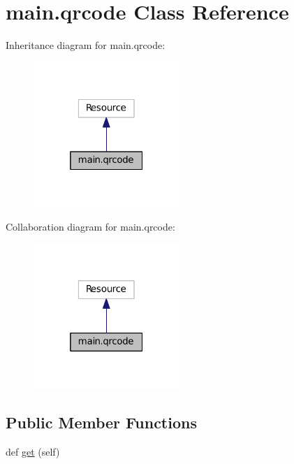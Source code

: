 \hypertarget{classmain_1_1qrcode}{}\section{main.\+qrcode Class Reference}
\label{classmain_1_1qrcode}


Inheritance diagram for main.\+qrcode\+:\nopagebreak
\begin{figure}[H]
\begin{center}
\leavevmode
\includegraphics[width=157pt]{classmain_1_1qrcode__inherit__graph}
\end{center}
\end{figure}


Collaboration diagram for main.\+qrcode\+:\nopagebreak
\begin{figure}[H]
\begin{center}
\leavevmode
\includegraphics[width=157pt]{classmain_1_1qrcode__coll__graph}
\end{center}
\end{figure}
\subsection*{Public Member Functions}
\begin{DoxyCompactItemize}
\item 
def \hyperlink{classmain_1_1qrcode_af826915a83b6a4d5c91686b332662da3}{get} (self)
\end{DoxyCompactItemize}


